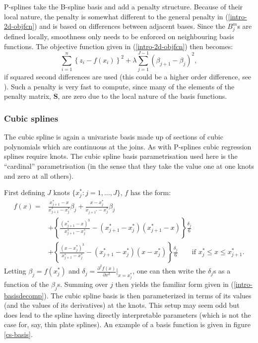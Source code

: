 P-splines take the B-spline basis and add a penalty structure. Because of their local nature, the penalty is somewhat different to the general penalty in (\ref{intro-2d-objfcn}) and is based on differences between adjacent bases. Since the $B^m_j$s are defined locally, smoothness only needs to be enforced on neighbouring basis functions. The objective function given in (\ref{intro-2d-objfcn}) then becomes:
\begin{equation*}
\sum_{i=1}^n \left \{ z_i - f(x_i) \right \}^2 +  \lambda \sum_{j=1}^{J-1} (\beta_{j+1} - \beta_j)^2,
\end{equation*}
if squared second differences are used (this could be a higher order difference, see \cite{eilersmarx96}). Such a penalty is very fast to compute, since many of the elements of the penalty matrix, $\mathbf{S}$, are zero due to the local nature of the basis functions.


\subsubsection{Cubic splines}
\label{intro-cubic}

The cubic spline is again a univariate basis made up of sections of cubic polynomials which are continuous at the joins. As with P-splines cubic regression splines require knots. The cubic spline basis parametrisation used here is the ``cardinal'' parametrisation (in the sense that they take the value one at one knots and zero at all others).

First defining $J$ knots $\{x_j^* : j=1,\ldots,J\}$, $f$ has the form:
\begin{align*}
f(x) =& \frac{x_{j+1}^* - x}{x_{j+1}^* - x_j^*} \beta_j + \frac{x - x_j^*}{x_{j+1^*} - x_j^*} \beta_j\\
& + \left\{ \frac{\left (x_{j+1}^* - x\right )^3}{x_{j+1}^* - x_j^*} - (x_{j+1}^* - x_j^*)(x_{j+1}^* - x)\right \}\frac{\delta_j}{6}\\
& + \left\{ \frac{\left (x - x_j^*\right )^3}{x_{j+1}^* - x_j^*} - (x_{j+1}^* - x_j^*)(x - x_j^*)\right \}\frac{\delta_j}{6} \qquad \text{if } x_j^* \leq x \leq x_{j+1}^*.
\end{align*}
Letting $\beta_j = f(x_j^*)$ and $\delta_j = \frac{\partial^2 f(x)}{\partial x^2}\vert_{x=x_j^*}$, one can then write the $\delta_j$s as a function of the $\beta_j$s. Summing over $j$ then yields the familiar form given in (\ref{intro-basisdecomp}). The cubic spline basis is then parameterized in terms of its values (and the values of its derivatives) at the knots. This setup may seem odd but does lead to the spline having directly interpretable parameters (which is not the case for, say, thin plate splines). An example of a basis function is given in figure \ref{cs-basis}.

